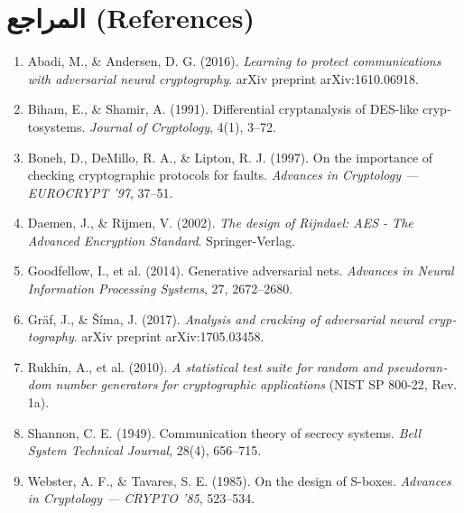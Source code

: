 \documentclass[12pt,a4paper]{article}
\begin{document}
\newpage

\section*{المراجع (References)}
\begin{english}
\begin{enumerate}
\item Abadi, M., \& Andersen, D. G. (2016). \textit{Learning to protect communications with adversarial neural cryptography}. arXiv preprint arXiv:1610.06918.
\item Biham, E., \& Shamir, A. (1991). Differential cryptanalysis of DES-like cryptosystems. \textit{Journal of Cryptology}, 4(1), 3–72.
\item Boneh, D., DeMillo, R. A., \& Lipton, R. J. (1997). On the importance of checking cryptographic protocols for faults. \textit{Advances in Cryptology — EUROCRYPT '97}, 37–51.
\item Daemen, J., \& Rijmen, V. (2002). \textit{The design of Rijndael: AES - The Advanced Encryption Standard}. Springer-Verlag.
\item Goodfellow, I., et al. (2014). Generative adversarial nets. \textit{Advances in Neural Information Processing Systems}, 27, 2672–2680.
\item Gräf, J., \& Šíma, J. (2017). \textit{Analysis and cracking of adversarial neural cryptography}. arXiv preprint arXiv:1705.03458.
\item Rukhin, A., et al. (2010). \textit{A statistical test suite for random and pseudorandom number generators for cryptographic applications} (NIST SP 800-22, Rev. 1a).
\item Shannon, C. E. (1949). Communication theory of secrecy systems. \textit{Bell System Technical Journal}, 28(4), 656–715.
\item Webster, A. F., \& Tavares, S. E. (1985). On the design of S-boxes. \textit{Advances in Cryptology — CRYPTO '85}, 523–534.
\end{enumerate}
\end{english}
\end{document}
